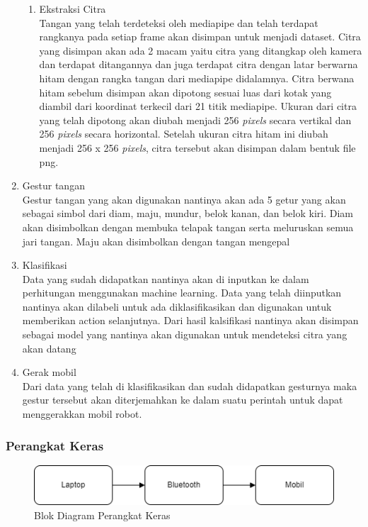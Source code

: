 \begin{enumerate}
\begin{enumerate}
  \item Ekstraksi Citra \\
  Tangan yang telah terdeteksi oleh mediapipe dan telah terdapat rangkanya pada setiap frame akan disimpan untuk menjadi dataset. Citra yang disimpan akan ada 2 macam yaitu citra yang ditangkap oleh kamera dan terdapat ditangannya dan juga terdapat citra dengan latar berwarna hitam dengan rangka tangan dari mediapipe didalamnya. Citra berwana hitam sebelum disimpan akan dipotong sesuai luas dari kotak yang diambil dari koordinat terkecil dari 21 titik mediapipe. Ukuran dari citra yang telah dipotong akan diubah menjadi 256 {\textit{pixels}} secara vertikal dan 256 {\textit{pixels}} secara horizontal. Setelah ukuran citra hitam ini diubah menjadi 256 x 256 {\textit{pixels}}, citra tersebut akan disimpan dalam bentuk file png.
\end{enumerate}

  \item Gestur tangan \\
  Gestur tangan yang akan digunakan nantinya akan ada 5 getur yang akan sebagai simbol dari diam, maju, mundur, belok kanan, dan belok kiri. Diam akan disimbolkan dengan membuka telapak tangan serta meluruskan semua jari tangan. Maju akan disimbolkan dengan tangan mengepal 
  
  \item Klasifikasi \\
  Data yang sudah didapatkan nantinya akan di inputkan ke dalam perhitungan menggunakan machine learning. Data yang telah diinputkan nantinya akan dilabeli untuk ada diklasifikasikan dan digunakan untuk memberikan action selanjutnya. Dari hasil kalsifikasi nantinya akan disimpan sebagai model yang nantinya akan digunakan untuk mendeteksi citra yang akan datang
  
  \item Gerak mobil \\
  Dari data yang telah di klasifikasikan dan sudah didapatkan gesturnya maka gestur tersebut akan diterjemahkan ke dalam suatu perintah untuk dapat menggerakkan mobil robot.
\end{enumerate}

\subsubsection{Perangkat Keras}

\begin{figure}[!htbp]
	\centering
	\includegraphics[width=0.7\linewidth]{"gambar/gambar perangkat keras"}
	\caption{Blok Diagram Perangkat Keras}
	\label{fig:gambar33}
\end{figure}


